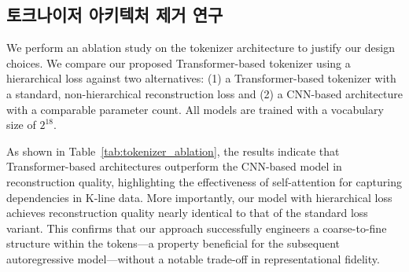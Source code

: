 \subsection{토크나이저 아키텍처 제거 연구}
\label{sec:tokenizer_ablation}
We perform an ablation study on the tokenizer architecture to justify our design choices. We compare our proposed Transformer-based tokenizer using a hierarchical loss against two alternatives: (1) a Transformer-based tokenizer with a standard, non-hierarchical reconstruction loss and (2) a CNN-based architecture with a comparable parameter count. All models are trained with a vocabulary size of $2^{18}$.

\begin{table}[ht]
\centering

\caption{
    Ablation study on the K-line tokenizer architecture. We compare our proposed Transformer-based tokenizer, which employs a hierarchical reconstruction loss, against two key variants: a Transformer-based tokenizer with a standard reconstruction loss and a CNN-based architecture. All models are trained with a vocabulary size of $2^{18}$. The table reports reconstruction quality measured by MAE and MSE.
}
\label{tab:tokenizer_ablation}
\end{table}

As shown in Table~\ref{tab:tokenizer_ablation}, the results indicate that Transformer-based architectures outperform the CNN-based model in reconstruction quality, highlighting the effectiveness of self-attention for capturing dependencies in K-line data. More importantly, our model with hierarchical loss achieves reconstruction quality nearly identical to that of the standard loss variant. This confirms that our approach successfully engineers a coarse-to-fine structure within the tokens—a property beneficial for the subsequent autoregressive model—without a notable trade-off in representational fidelity.

